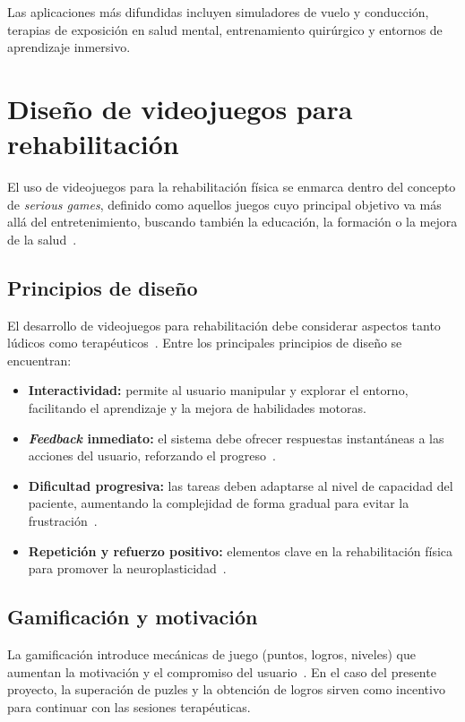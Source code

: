 Las aplicaciones más difundidas incluyen simuladores de vuelo y conducción, terapias de exposición en salud mental, entrenamiento quirúrgico y entornos de aprendizaje inmersivo.

\section{Diseño de videojuegos para rehabilitación}

El uso de videojuegos para la rehabilitación física se enmarca dentro del concepto de \textit{serious games}, definido como aquellos juegos cuyo principal objetivo va más allá del entretenimiento, buscando también la educación, la formación o la mejora de la salud~\cite{david2016serious}.

\subsection{Principios de diseño}

El desarrollo de videojuegos para rehabilitación debe considerar aspectos tanto lúdicos como terapéuticos~\cite{greene2016rehab}. Entre los principales principios de diseño se encuentran:

\begin{itemize}
    \item \textbf{Interactividad:} permite al usuario manipular y explorar el entorno, facilitando el aprendizaje y la mejora de habilidades motoras.
    \item \textbf{\textit{Feedback} inmediato:} el sistema debe ofrecer respuestas instantáneas a las acciones del usuario, reforzando el progreso~\cite{cameirao2010impact}.
    \item \textbf{Dificultad progresiva:} las tareas deben adaptarse al nivel de capacidad del paciente, aumentando la complejidad de forma gradual para evitar la frustración~\cite{zimmerli2012virtual}.
    \item \textbf{Repetición y refuerzo positivo:} elementos clave en la rehabilitación física para promover la neuroplasticidad~\cite{holden2005virtual}.
\end{itemize}

\subsection{Gamificación y motivación}

La gamificación introduce mecánicas de juego (puntos, logros, niveles) que aumentan la motivación y el compromiso del usuario~\cite{sardi2017gamification}. En el caso del presente proyecto, la superación de puzles y la obtención de logros sirven como incentivo para continuar con las sesiones terapéuticas.

